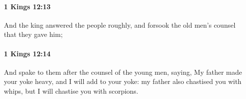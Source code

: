 		\paragraph{1 Kings 12:13} %
			\label{1KINGS-12-13}

			And the king answered the people roughly, and forsook the old men’s counsel that they gave him;


		\paragraph{1 Kings 12:14} %
			\label{1KINGS-12-14}

			And spake to them after the counsel of the young men, saying, My father made your yoke heavy, and I will add to your yoke: my father also chastised you with whips, but I will chastise you with scorpions.


